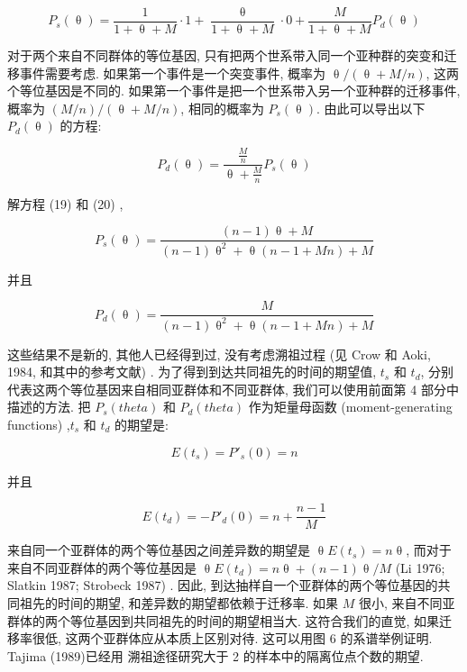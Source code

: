 \documentclass[12pt]{article}
\begin{document}
\begin{equation} \label{eq:19}
    P_{s}(\uptheta)=\frac{1}{1+\uptheta +M}\cdot 1+\frac{\uptheta}{1+\uptheta +M}\cdot 0+\frac{M}{1+\uptheta +M}P_{d}(\uptheta)
\end{equation}

对于两个来自不同群体的等位基因, 只有把两个世系带入同一个亚种群的突变和迁移事件需要考虑. 如果第一个事件是一个突变事件,
概率为 $\uptheta /(\uptheta +M/n)$, 这两个等位基因是不同的. 如果第一个事件是把一个世系带入另一个亚种群的迁移事件, 概率为
$(M/n)/(\uptheta +M/n)$, 相同的概率为 $P_{s}(\uptheta)$. 由此可以导出以下 $P_{d}(\uptheta)$ 的方程:

\begin{equation} \label{eq:20}
    P_{d}(\uptheta)=\frac{\frac{M}{n}}{\uptheta +\frac{M}{n}}P_{s}(\uptheta)
\end{equation}

解方程 (19) 和 (20) ,

\begin{equation} \label{eq:21}
    P_{s}(\uptheta)=\frac{(n-1)\uptheta +M}{(n-1)\uptheta ^{2}+\uptheta (n-1+Mn)+M}
\end{equation}

并且

\begin{equation} \label{eq:22}
    P_{d}(\uptheta)=\frac{M}{(n-1)\uptheta ^{2}+\uptheta (n-1+Mn)+M}
\end{equation}

这些结果不是新的, 其他人已经得到过, 没有考虑溯祖过程 (见 Crow 和 Aoki, 1984, 和其中的参考文献) .
为了得到到达共同祖先的时间的期望值, $t_{s}$ 和 $t_{d}$, 分别代表这两个等位基因来自相同亚群体和不同亚群体,
我们可以使用前面第 4 部分中描述的方法. 把 $P_{s}(theta )$ 和 $P_{d}(theta )$ 作为矩量母函数 (moment-generating
functions) ,$t_{s}$ 和 $t_{d}$ 的期望是:

\begin{equation} \label{eq:23}
    E(t_{s}) = P'_{s}(0) = n
\end{equation}

并且

\begin{equation} \label{eq:24}
    E(t_{d}) = -P'_{d}(0) = n + \frac{n-1}{M}
\end{equation}

来自同一个亚群体的两个等位基因之间差异数的期望是 $\uptheta E(t_{s}) = n \uptheta$, 而对于来自不同亚群体的两个等位基因是
$\uptheta E(t_{d}) = n \uptheta +(n-1)\uptheta /M$ (Li 1976; Slatkin 1987; Strobeck 1987) . 因此,
到达抽样自一个亚群体的两个等位基因的共同祖先的时间的期望, 和差异数的期望都依赖于迁移率. 如果 $M$ 很小,
来自不同亚群体的两个等位基因到共同祖先的时间的期望相当大. 这符合我们的直觉, 如果迁移率很低, 这两个亚群体应从本质上区别对待.
这可以用图 6 的系谱举例证明. Tajima (1989)已经用 溯祖途径研究大于 2 的样本中的隔离位点个数的期望.
\end{document}
